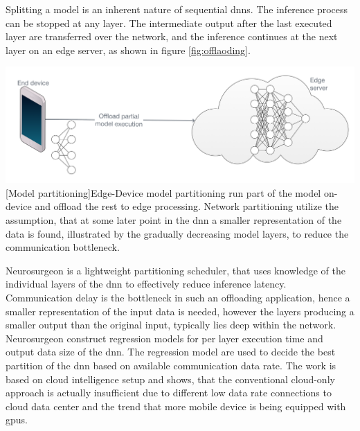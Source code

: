 \begin{enumdescript}
	\item[Model partitioning] 
	Splitting a model is an inherent nature of sequential \gls{dnn}s. The inference process can be stopped at any layer. The intermediate output after the last executed layer are transferred over the network, and the inference continues at the next layer on an edge server, as shown in figure \ref{fig:offlaoding}.
	
	\begin{minipage}[t]{\linewidth}    
		\centering
		\includegraphics[width=\linewidth]{figures/models/partitioning}
		[Model partitioning]{Edge-Device model partitioning run part of the model on-device and offload the rest to edge processing. Network partitioning utilize the assumption, that at some later point in the \gls{dnn} a smaller representation of the data is found, illustrated by the gradually decreasing model layers, to reduce the communication bottleneck. }
		\label{fig:offlaoding}
	\end{minipage}
	
	Neurosurgeon \cite{kang_neurosurgeon:_2017} is a lightweight partitioning scheduler, that uses knowledge of the individual layers of the \gls{dnn} to effectively reduce inference latency. Communication delay is the bottleneck in such an offloading application, hence a smaller representation of the input data is needed, however the layers producing a smaller output than the original input, typically lies deep within the network. Neurosurgeon construct regression models for per layer execution time and output data size of the \gls{dnn}. The regression model are used to decide the best partition of the \gls{dnn} based on available communication data rate. The work is based on cloud intelligence setup and shows, that the conventional cloud-only approach is actually insufficient due to different low data rate connections to cloud data center and the trend that more mobile device is being equipped with \gls{gpu}s. 
	

\end{enumdescript}
